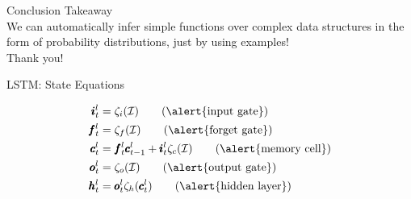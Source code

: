 \documentclass{beamer}
\newcommand{\xx}{\pmb{\raisebox{-1.5pt}{$\mathcal{X}$}}}
\newcommand{\hh}{\pmb{h}}
\newcommand{\ii}{\pmb{i}}
\newcommand{\oo}{\pmb{o}}
\newcommand{\ff}{\pmb{f}}
\newcommand{\Ss}{\pmb{s}}
\newcommand{\Cc}{\pmb{c}}
\newcommand{\bb}{\pmb{b}}
\begin{document}
\begin{frame}{Conclusion}
	\alert{Takeaway}\\
	We can automatically infer simple functions over complex data structures in the form of \alert{probability distributions}, just by using examples!\\
		
	\pause
	\center	\alert{Thank you!}
\end{frame}

\begin{frame}{LSTM: State Equations}

	\begin{align}
	\ii_t^l &= \zeta_i(\mathcal{I}) \tag{\alert{input gate}}\\
	\ff_t^l &= \zeta_f(\mathcal{I})	\tag{\alert{forget gate}}\\
	\Cc_t^l &= \ff_t^l\Cc_{t-1}^l + \ii_t^l\zeta_c(\mathcal{I}) \tag{\alert{memory cell}}\\
	\oo_t^l &= \zeta_o(\mathcal{I})	\tag{\alert{output gate}}\\
	\hh_t^l &= \oo_t^l\zeta_h(\Cc_t^l)		\tag{\alert{hidden layer}}
	\end{align}
\end{frame}
\end{document}
